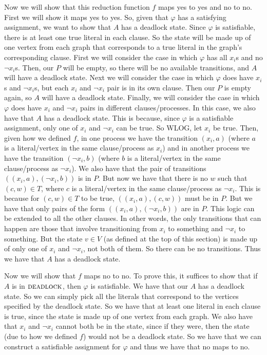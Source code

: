 \documentclass{article}
\begin{document}
\begin{description}
        Now we will show that this reduction function $f$ maps yes to yes and no
        to no. First we will show it maps yes to yes. So, given that $\varphi$
        has a satisfying assignment, we want to show that $A$ has a deadlock
        state. Since $\varphi$ is satisfiable, there is at least one true
        literal in each clause. So the state will be made up of one vertex
        from each graph that corresponds to a true literal in the graph's
        corresponding clause.
        First we will consider the case in which $\varphi$ has all
        $x_i$s and no $\neg x_i$s. Then, our $P$ will be empty, so there will
        be no available transitions, and $A$ will have a deadlock state. Next
        we will consider the case in which $\varphi$ does have $x_i$s and
        $\neg x_i$s, but each $x_i$ and $\neg x_i$ pair is in its own clause.
        Then our $P$ is empty again, so $A$ will have a deadlock state. Finally,
        we will consider the case in which $\varphi$ does have $x_i$ and $\neg
        x_i$ pairs in different clauses/processes. In this case, we also have
        that $A$ has a deadlock state. This is because, since $\varphi$ is a
        satisfiable assignment, only one of $x_i$ and $\neg x_i$ can be true.
        So WLOG, let $x_i$ be true. Then, given how we defined $f$, in one
        process we have the transition $(x_i, a)$ (where $a$ is a literal/vertex
        in the same clause/process as $x_i$) and in another process we have the
        transition $(\neg x_i, b)$ (where $b$ is a literal/vertex
        in the same clause/process as $\neg x_i$). We also have that the pair
        of transitions $((x_i, a), (\neg x_i, b))$ is in $P$. But now we have
        that there is no $w$ such that $(c, w) \in T$, where $c$ is a
        literal/vertex in the same clause/process as $\neg x_i$. This is because
        for $(c, w) \in T$ to be true, $((x_i, a), (c, w))$ must be in $P$. But
        we have that only pairs of the form $((x_i, a), (\neg x_i, b))$ are in
        $P$. This logic can be extended to all the other clauses. In other
        words, the only transitions that can happen are those that involve
        transitioning from $x_i$ to something and $\neg x_i$ to something. But
        the state $v \in V$ (as defined at the top of this section)
        is made up of only one of $x_i$ and $\neg x_i$, not both of them. So
        there can be no transitions.  Thus we have that $A$ has a deadlock state.

        Now we will show that $f$ maps no to no. To prove this, it suffices to
        show that if $A$ is in $\mbox{\sc deadlock}$, then $\varphi$ is
        satisfiable. We have that our $A$ has a deadlock state. So we can simply
        pick all the literals that correspond to the vertices specified by
        the deadlock state. So we have that at least one literal in each clause
        is true, since the state is made up of one vertex from each graph. We
        also have that $x_i$ and $\neg x_i$ cannot both be in the state, since
        if they were, then the state (due to how we defined $f$) would not be a
        deadlock state. So we have that we can construct a satisfiable
        assignment for $\varphi$ and thus we have that no maps to no.


\end{description}
\end{document}
